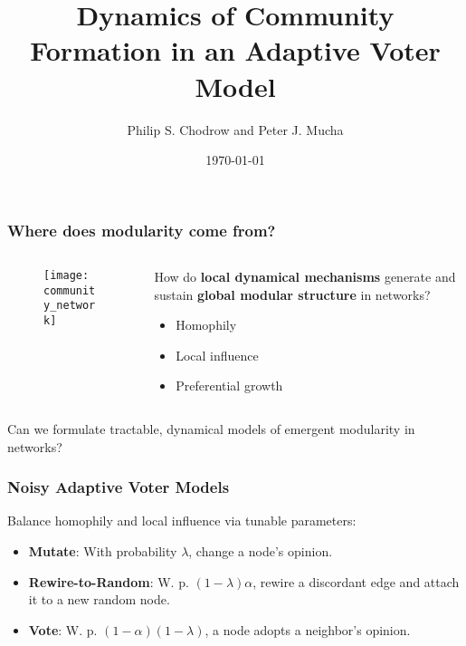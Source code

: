 \documentclass{beamer}
\title{Dynamics of Community Formation in an Adaptive Voter Model}
\date{\today}
\author{Philip S. Chodrow and Peter J. Mucha}
\institute{
	\vspace{6.4mm}
	$\vcenter{\hbox{\texttt{[image: PJM]}}}$
	\hspace*{.5cm}
	$\vcenter{\hbox{\texttt{[image: mit\_logo]}}}$
	\hspace*{.5cm}
	$\vcenter{\hbox{\texttt{[image: UNC]}}}$
	\hspace*{.5cm}
	$\vcenter{\hbox{\texttt{[image: nsf\_logo]}}}$
}
\begin{document}
\maketitle

		
		\begin{frame}\frametitle{Where does \alert{modularity} come from?}
		\begin{columns}
			\begin{column}{0.5\textwidth}
				\begin{figure}
			  		\centering
			  		\texttt{[image: community\_network]}
			  		\caption{\tiny{}} 
			  	\end{figure}
			\end{column}
			\begin{column}{0.5\textwidth}
				How do \textbf{local dynamical mechanisms} generate and sustain \textbf{global modular structure} in networks? 
				\begin{itemize}
					\item Homophily
					\item Local influence
					\item Preferential growth
				\end{itemize}
			\end{column}
		\end{columns}
		\centering
		\end{frame}

		\begin{frame}[standout]
			Can we formulate \alert{tractable}, \alert{dynamical} models of emergent modularity in networks?
		\end{frame}
		
		\begin{frame}\frametitle{Noisy Adaptive Voter Models}
		  	Balance homophily and local influence via tunable parameters:  
		  	\begin{itemize}
		  		\item \textbf{Mutate}: With probability $\lambda$, change a node's opinion.
		  		\item \textbf{Rewire-to-Random}: W. p. $(1-\lambda)\alpha$, rewire a discordant edge and attach it to a new random node.
		  		\item \textbf{Vote}: W. p. $(1-\alpha)(1-\lambda)$, a node adopts a neighbor's opinion. 
		  	\end{itemize}
		\end{frame}
\end{document}
